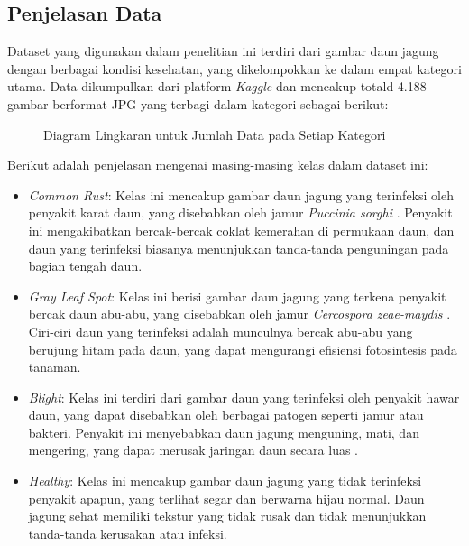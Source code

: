 \documentclass[journal,article,submit,pdftex,moreauthors]{Definitions/mdpi}
\begin{document}
\subsection{Penjelasan Data}

Dataset yang digunakan dalam penelitian ini terdiri dari gambar daun jagung dengan berbagai kondisi kesehatan, yang dikelompokkan ke dalam empat kategori utama. Data dikumpulkan dari platform \textit{Kaggle} dan mencakup totald 4.188 gambar berformat JPG yang terbagi dalam kategori sebagai berikut:

\begin{figure}[h!]
    \centering
    \caption{\centering Diagram Lingkaran untuk Jumlah Data pada Setiap Kategori}
    \label{fig:pie_chart}
\end{figure}

Berikut adalah penjelasan mengenai masing-masing kelas dalam dataset ini:

\begin{itemize}
    \item {\textit{Common Rust}}: Kelas ini mencakup gambar daun jagung yang terinfeksi oleh penyakit karat daun, yang disebabkan oleh jamur \textit{Puccinia sorghi} \cite{BROWN2002}. Penyakit ini mengakibatkan bercak-bercak coklat kemerahan di permukaan daun, dan daun yang terinfeksi biasanya menunjukkan tanda-tanda penguningan pada bagian tengah daun.
    \item {\textit{Gray Leaf Spot}}: Kelas ini berisi gambar daun jagung yang terkena penyakit bercak daun abu-abu, yang disebabkan oleh jamur \textit{Cercospora zeae-maydis} \cite{CERON2023}. Ciri-ciri daun yang terinfeksi adalah munculnya bercak abu-abu yang berujung hitam pada daun, yang dapat mengurangi efisiensi fotosintesis pada tanaman.
    \item {\textit{Blight}}: Kelas ini terdiri dari gambar daun yang terinfeksi oleh penyakit hawar daun, yang dapat disebabkan oleh berbagai patogen seperti jamur atau bakteri. Penyakit ini menyebabkan daun jagung menguning, mati, dan mengering, yang dapat merusak jaringan daun secara luas \cite{JAKHAR2023}.
    \item {\textit{Healthy}}: Kelas ini mencakup gambar daun jagung yang tidak terinfeksi penyakit apapun, yang terlihat segar dan berwarna hijau normal. Daun jagung sehat memiliki tekstur yang tidak rusak dan tidak menunjukkan tanda-tanda kerusakan atau infeksi.
\end{itemize}
\end{document}
